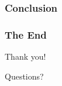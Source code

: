 \documentclass{beamer}
\begin{document}
\begin{frame}
\frametitle{Conclusion}

\end{frame}


\begin{frame}
\frametitle{The End}
Thank you!
	
Questions?
\end{frame}






\end{document}
